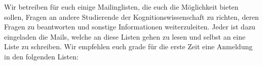 Wir betreiben für euch einige Mailinglisten, die euch die Möglichkeit bieten sollen, Fragen an andere Studierende der Kognitionswissenschaft zu richten, deren Fragen zu beantworten und sonstige Informationen weiterzuleiten.  Jeder ist dazu eingeladen die Mails, welche an diese Listen gehen zu lesen und selbst an eine Liste zu schreiben. Wir empfehlen euch grade für die erste Zeit eine Anmeldung in den folgenden Listen:\\


\newcommand{\mlinfoadressen}[1]{
    Anmelden: Leere Mail an {\footnotesize \email{#1-subscribe@fsi.uni-tuebingen.de}} \\
    Abmelden: Leere Mail an {\footnotesize \email{#1-unsubscribe@fsi.uni-tuebingen.de}} \\
    Hilfetext: Mail mit Betreff \emph{help} an {\footnotesize \email{#1-request@fsi.uni-tuebingen.de}}}

\newcommand{\mlpsychoadressen}[1]{
	Anmelden: Leere Mail an {\footnotesize \email{#1-subscribe@fs-psycho.uni-tuebingen.de}} \\
	Abmelden: Leere Mail an {\footnotesize \email{#1-unsubscribe@fs-psycho.uni-tuebingen.de}} \\
	Hilfetext: Mail mit Betreff \emph{help} an {\footnotesize \email{#1-request@fs-psycho.uni-tuebingen.de}}}

